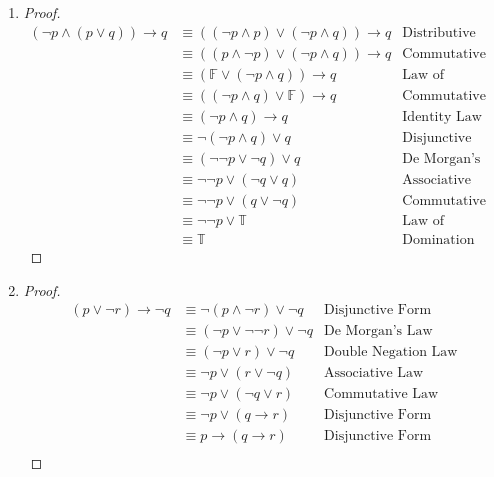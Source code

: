 \begin{Solution}{2.7}

\begin{enumerate}[label=(\alph*)]

\item
\begin{proof}
\begin{align*}
(\lnot p\land (p\lor q))\to q
&\equiv ((\lnot p \land p) \lor(\lnot p\land q)) \to q        &\text{Distributive Law}\\
&\equiv ((p \land \lnot p) \lor(\lnot p\land q)) \to q    &\text{Commutative Law}\\
&\equiv (\mathbb{F} \lor (\lnot p\land q)) \to q   &\text{Law of Contradiction}\\
&\equiv ((\lnot p\land q) \lor \mathbb{F})\to q                 &\text{Commutative Law}\\
&\equiv (\lnot p\land q)\to q                                &\text{Identity Law}\\
&\equiv \lnot(\lnot p\land q)\lor q                         &\text{Disjunctive Form}\\
&\equiv (\lnot\lnot p \lor \lnot q) \lor q     &\text{De Morgan's Law}\\
&\equiv \lnot\lnot p\lor(\lnot q\lor q)                        &\text{Associative Law}\\
&\equiv \lnot\lnot p\lor(q\lor\lnot q)                        &\text{Commutative Law}\\
&\equiv \lnot\lnot p \lor \mathbb{T}                     &\text{Law of Excluded Middle}\\
& \equiv \mathbb{T}         &\text{Domination Law}
\end{align*}   
\end{proof}

\item
\begin{proof}
\begin{align*}
(p \lor \lnot r)\to \lnot q
&\equiv \lnot (p \land \lnot r) \lor \lnot q         &\text{Disjunctive Form}\\
&\equiv (\lnot p \lor \lnot\lnot r) \lor \lnot q   &\text{De Morgan's Law}\\
&\equiv (\lnot p\lor r) \lor\lnot q                  &\text{Double Negation Law}\\
&\equiv \lnot p\lor( r\lor\lnot q)       &\text{Associative Law}\\
&\equiv \lnot p\lor(\lnot q\lor r) &\text{Commutative Law}\\
&\equiv \lnot p \lor (q \to r)     &\text{Disjunctive Form}\\
&\equiv  p \to (q\to r)      &\text{Disjunctive Form}\\
\end{align*}
\end{proof}


\end{enumerate}
\end{Solution}
